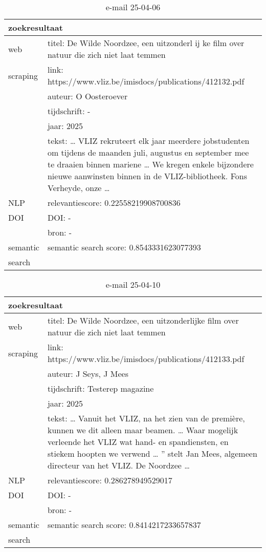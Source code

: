 \begin{table}[h!]
    \caption{e-mail 25-04-06}
    \centering
    \begin{tabularx}{\textwidth}{|p{4cm}|X|} 
        \hline
        \multicolumn{2}{|X|}{\textbf{zoekresultaat}} \\
        \hline
        web &titel: De Wilde Noordzee, een uitzonderl ij ke film over natuur die zich niet laat temmen\\
        scraping&link: https://www.vliz.be/imisdocs/publications/412132.pdf\\
        &auteur: O Oosteroever\\
        &tijdschrift: -\\
        &jaar: 2025\\
        &tekst: … VLIZ rekruteert elk jaar meerdere jobstudenten om tijdens de maanden juli, augustus en september mee te draaien binnen mariene … We kregen enkele bijzondere nieuwe aanwinsten binnen in de VLIZ-bibliotheek. Fons Verheyde, onze …\\
        \hline
        NLP&relevantiescore: 0.22558219908700836\\
        \hline
        DOI&DOI: -\\
        &bron: -\\
        \hline
        semantic&semantic search score: 0.8543331623077393\\
        search&\\
        \hline
    \end{tabularx}
    \label{table:email20250406}
\end{table}
\begin{table}[h!]
    \caption{e-mail 25-04-10}
    \centering
    \begin{tabularx}{\textwidth}{|p{4cm}|X|} 
        \hline
        \multicolumn{2}{|X|}{\textbf{zoekresultaat}} \\
        \hline
        web &titel: De Wilde Noordzee, een uitzonderlijke film over natuur die zich niet laat temmen\\
        scraping&link: https://www.vliz.be/imisdocs/publications/412133.pdf\\
        &auteur:  J Seys, J Mees\\
        &tijdschrift: Testerep magazine\\
        &jaar: 2025\\
        &tekst: … Vanuit het VLIZ, na het zien van de première, kunnen we dit alleen maar beamen. … Waar mogelijk verleende het VLIZ wat hand- en spandiensten, en stiekem hoopten we verwend … ” stelt Jan Mees, algemeen directeur van het VLIZ. De Noordzee …\\
        \hline
        NLP&relevantiescore: 0.286278949529017\\
        \hline
        DOI&DOI: -\\
        &bron: -\\
        \hline
        semantic&semantic search score: 0.8414217233657837\\
        search&\\
        \hline
    \end{tabularx}
    \label{table:email20250410}
\end{table}
